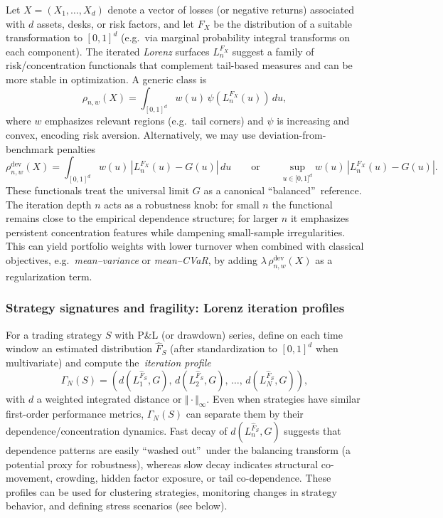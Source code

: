 \documentclass[onecolumn]{article}
\begin{document}
Let $X=(X_{1},\dots ,X_{d})$ denote a vector of losses (or negative returns)
associated with $d$ assets, desks, or risk factors, and let $F_{X}$ be the
distribution of a suitable transformation to $[0,1]^{d}$ (e.g.\ via marginal
probability integral transforms on each component). The iterated \textit{%
Lorenz} surfaces $L_{n}^{F_{X}}$ suggest a family of risk/concentration
functionals that complement tail-based measures and can be more stable in
optimization. A generic class is 
\begin{equation}
\rho _{n,w}(X)=\int_{[0,1]^{d}}w(u)\,\psi \!(L_{n}^{F_{X}}(u))\,du,
\label{2083}
\end{equation}%
where $w$ emphasizes relevant regions (e.g.\ tail corners) and $\psi $ is
increasing and convex, encoding risk aversion. Alternatively, we may use
deviation-from-benchmark penalties 
\begin{equation}
\rho _{n,w}^{\mathrm{dev}}(X)=\int_{[0,1]^{d}}w(u)\,\left\vert
L_{n}^{F_{X}}(u)-G(u)\right\vert \,du\qquad \text{or}\qquad \sup_{u\in
\lbrack 0,1]^{d}}w(u)\,\left\vert L_{n}^{F_{X}}(u)-G(u)\right\vert .
\label{2084}
\end{equation}%
These functionals treat the universal limit $G$ as a canonical
\textquotedblleft balanced\textquotedblright\ reference. The iteration depth 
$n$ acts as a robustness knob: for small $n$ the functional remains close to
the empirical dependence structure; for larger $n$ it emphasizes persistent
concentration features while dampening small-sample irregularities. This can
yield portfolio weights with lower turnover when combined with classical
objectives, e.g.\ \textit{mean--variance} or \textit{mean--CVaR}, by adding $%
\lambda \,\rho _{n,w}^{\mathrm{dev}}(X)$ as a regularization term.

\subsubsection{Strategy signatures and fragility: Lorenz iteration profiles}

For a trading strategy $S$ with P\&L (or drawdown) series, define on each
time window an estimated distribution $\widehat{F}_{S}$ (after
standardization to $[0,1]^{d}$ when multivariate) and compute the\textit{\
iteration profile} 
\begin{equation}
\Gamma _{N}(S)=(d(L_{1}^{\widehat{F}_{S}},G),\,d(L_{2}^{\widehat{F}%
_{S}},G),\,\dots ,\,d(L_{N}^{\widehat{F}_{S}},G)),  \label{2085}
\end{equation}%
with $d$ a weighted integrated distance or $\Vert \cdot \Vert _{\infty }$.
Even when strategies have similar first-order performance metrics, $\Gamma
_{N}(S)$ can separate them by their dependence/concentration dynamics. Fast
decay of $d(L_{n}^{\widehat{F}_{S}},G)$ suggests that dependence patterns
are easily \textquotedblleft washed out\textquotedblright\ under the
balancing transform (a potential proxy for robustness), whereas slow decay
indicates structural co-movement, crowding, hidden factor exposure, or tail
co-dependence. These profiles can be used for clustering strategies,
monitoring changes in strategy behavior, and defining stress scenarios (see
below).
\end{document}
